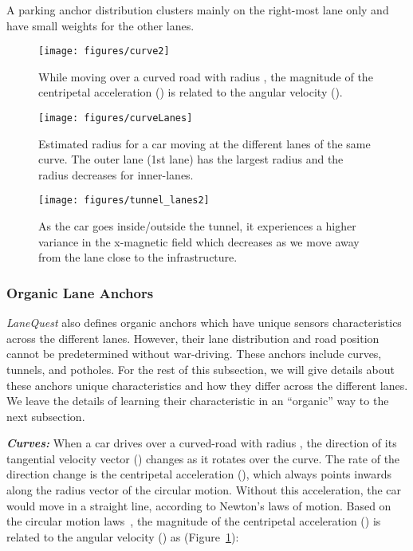 \documentclass[10pt, conference, compsocconf]{IEEEtran}
\def \sys {\textit{LaneQuest}}
\newcommand{\figscale}{0.7}
\begin{document}
A parking anchor distribution clusters mainly on the right-most lane only and have small weights for the other lanes.

     \begin{figure}[!t]
\centering
\texttt{[image: figures/curve2]}
\caption{While moving over a curved road with radius , the magnitude of the centripetal acceleration () is related to the angular velocity ().}
\label{fig:curve_rule}
\end{figure}
\begin{figure}[!t]
    \centering
      \texttt{[image: figures/curveLanes]}
      \caption{Estimated radius for a car moving at the different lanes of the same curve. The outer lane (1st lane) has the largest radius and the radius decreases for inner-lanes. }
\label{fig:curve_rad}
\end{figure}

\begin{figure}[!t]
\centering
\texttt{[image: figures/tunnel\_lanes2]}
\caption{\small As the car goes inside/outside the tunnel, it experiences a higher variance in the x-magnetic field which decreases as we move away from the lane close to the infrastructure.
}
\label{fig:tunnel_lanes_ex}
\end{figure}
\subsubsection{Organic Lane Anchors}\label{sec:curve_lane}
\sys{} also defines organic anchors which have unique sensors characteristics across the different lanes. However, their lane distribution and road position cannot be predetermined without war-driving. These anchors include curves, tunnels, and potholes. For the rest of this subsection, we will give details about these anchors unique characteristics and how they differ across the different lanes. We leave the details of learning their characteristic in an ``organic'' way to the next subsection.

\noindent\textbf{\textit{Curves:}}
When a car drives over a curved-road with radius , the direction of its tangential velocity vector () changes as it rotates over the curve. The rate of the direction change is the centripetal acceleration (), which always points inwards along the radius vector of the circular motion. Without this acceleration, the car would move in a straight line, according to Newton's laws of motion. Based on the circular motion laws~\cite{serway2013physics}, the magnitude of the centripetal acceleration () is related to the angular velocity () as (Figure~\ref{fig:curve_rule}):
\end{document}

